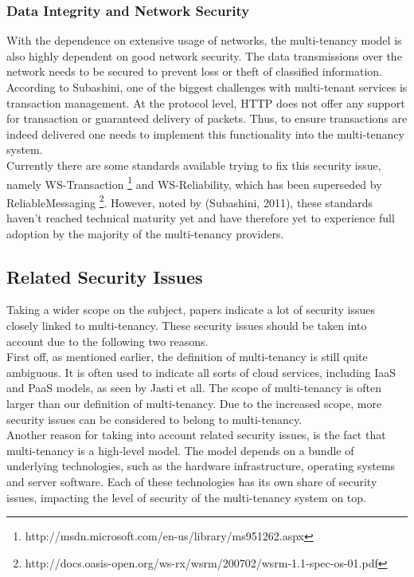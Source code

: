 \subsubsection{Data Integrity and Network Security}
With the dependence on extensive usage of networks, the multi-tenancy model is also highly dependent on good network security.  The data transmissions over the network needs to be secured to prevent loss or theft of classified information. According to Subashini\cite{Subashini2011Security}, one of the biggest challenges with multi-tenant services is transaction management. At the protocol level, HTTP does not offer any support for transaction or guaranteed delivery of packets. Thus, to ensure transactions are indeed delivered one needs to implement this functionality into the multi-tenancy system.\\
	Currently there are some standards available trying to fix this security issue, namely WS-Transaction \footnote{http://msdn.microsoft.com/en-us/library/ms951262.aspx} and WS-Reliability, which has been superseded by ReliableMessaging \footnote{http://docs.oasis-open.org/ws-rx/wsrm/200702/wsrm-1.1-spec-os-01.pdf}. However, noted by (Subashini, 2011), these standards haven’t reached technical maturity yet and have therefore yet to experience full adoption by the majority of the multi-tenancy providers.

\subsection{Related Security Issues}
Taking a wider scope on the subject, papers indicate a lot of security issues closely linked to multi-tenancy. These security issues should be taken into account due to the following two reasons.\\
First off, as mentioned earlier, the definition of multi-tenancy is still quite ambiguous. It is often used to indicate all sorts of cloud services, including IaaS and PaaS models, as seen by Jasti et all\cite{Jasti2010Security}. The scope of multi-tenancy is often larger than our definition of multi-tenancy. Due to the increased scope, more security issues can be considered to belong to multi-tenancy. \\
Another reason for taking into account related security issues, is the fact that multi-tenancy is a high-level model. The model depends on a bundle of underlying technologies, such as the hardware infrastructure, operating systems and server software. Each of these technologies has its own share of security issues, impacting the level of security of the multi-tenancy system on top. 

